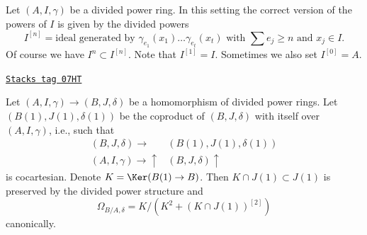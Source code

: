 Let $(A, I, \gamma)$ be a divided power ring. In this setting the
correct version of the powers of $I$ is given by the divided powers
$$
I^{[n]} = \text{ideal generated by }
\gamma_{e_1}(x_1) \ldots \gamma_{e_t}(x_t)
\text{ with }\sum e_j \geq n\text{ and }x_j \in I.
$$
Of course we have $I^n \subset I^{[n]}$. Note that $I^{[1]} = I$.
Sometimes we also set $I^{[0]} = A$.

\begin{lemma}
\label{crystalline-lemma-diagonal-and-differentials}
\href{https://stacks.math.columbia.edu/tag/07HT}{\texttt{Stacks tag 07HT}}

Let $(A, I, \gamma) \to (B, J, \delta)$ be a homomorphism
of divided power rings. Let $(B(1), J(1), \delta(1))$ be the coproduct
of $(B, J, \delta)$ with itself over $(A, I, \gamma)$, i.e.,
such that
$$
\begin{array}{cc}(B, J, \delta) \longrightarrow & (B(1), J(1), \delta(1)) \\ (A, I, \gamma) \longrightarrow\uparrow & (B, J, \delta) \uparrow\end{array}
$$
is cocartesian. Denote $K = \Ker(B(1) \to B)$.
Then $K \cap J(1) \subset J(1)$ is preserved by the divided power
structure and
$$
\Omega_{B/A, \delta} = K/ \left(K^2 + (K \cap J(1))^{[2]}\right)
$$
canonically.
\end{lemma}

